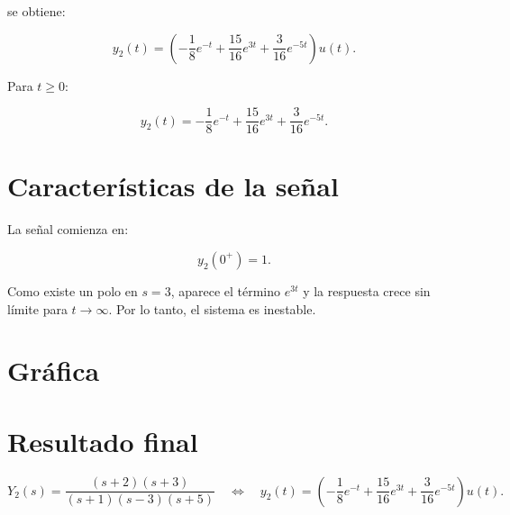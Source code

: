 \documentclass[12pt,a4paper]{article}
\begin{document}
se obtiene:

\begin{equation}
    \boxed{
    y_2(t)=\left(-\frac{1}{8}e^{-t}
    +\frac{15}{16}e^{3t}
    +\frac{3}{16}e^{-5t}\right)u(t)
    }.
\end{equation}

Para $t\geq 0$:

\begin{equation}
    \boxed{
    y_2(t)=-\frac{1}{8}e^{-t}
    +\frac{15}{16}e^{3t}
    +\frac{3}{16}e^{-5t}
    }.
\end{equation}

\section*{Características de la señal}

La señal comienza en:

\begin{equation}
    y_2(0^+)=1.
\end{equation}

Como existe un polo en $s=3$, aparece el término $e^{3t}$ y la respuesta crece
sin límite para $t\to\infty$. Por lo tanto, el sistema es inestable.

\section*{Gráfica}

\begin{center}
\end{center}

\section*{Resultado final}

\begin{equation}
    \boxed{
    Y_2(s)=\frac{(s+2)(s+3)}{(s+1)(s-3)(s+5)}
    \quad\Longleftrightarrow\quad
    y_2(t)=\left(-\frac{1}{8}e^{-t}
    +\frac{15}{16}e^{3t}+\frac{3}{16}e^{-5t}\right)u(t)
    }.
\end{equation}
\end{document}

